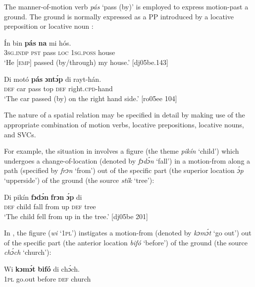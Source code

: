 The manner-of-motion verb \textit{pás} ‘pass (by)’ is employed to express motion-past a ground. The ground is normally expressed as a PP introduced by a locative preposition  or locative noun : 


\ea%
    \label{ex:key:986}
    \gll \'{I}n    bin  \textbf{pás}  \textbf{na} mi    hós.\\
\textsc{3sg.indp}  \textsc{pst}  pass  \textsc{loc}  \textsc{1sg.poss}  house\\
\glt ‘He [\textsc{emp}] passed (by/through) my house.’ [dj05be.143]
\z

\ea%
    \label{ex:key:987}
    \gll Di  motó  \textbf{pás}  \textbf{ɔntɔ́p}  di  rayt-hán.\\
\textsc{def}  car    pass  top    \textsc{def}  right.\textsc{cpd}{}-hand\\

\glt ‘The car passed (by) on the right hand side.’ [ro05ee 104]
\z

The nature of a spatial relation may be specified in detail by making use of the appropriate combination of motion verbs, locative prepositions, locative nouns, and SVCs.


For example, the situation in  involves a figure (the theme \textit{pikín} ‘child’) which undergoes a change-of-location (denoted by \textit{fɔdɔ́n} ‘fall’) in a motion-from along a path (specified by \textit{frɔn} ‘from’) out of the specific part (the superior location \textit{ɔ́p} ‘upperside’) of the ground (the source \textit{stík} ‘tree’):



\ea%
    \label{ex:key:988}
    \gll Di  pikín  \textbf{fɔdɔ́n}  \textbf{frɔn}    \textbf{ɔ́p}  di  \\
\textsc{def}  child  fall    from  up  \textsc{def}  tree\\

\glt ‘The child fell from up in the tree.’ [dj05be 201]
\z

In , the figure (\textit{wi} ‘\textsc{1pl}’) instigates a motion-from (denoted by \textit{kɔmɔ́t} ‘go out’) out of the specific part (the anterior location \textit{bifó} ‘before’) of the ground (the source \textit{chɔ́ch} ‘church’): 


\ea%
    \label{ex:key:989}
    \gll Wi  \textbf{kɔmɔ́t}  \textbf{bifó}    di  chɔ́ch.\\
\textsc{1pl}  go.out  before  \textsc{def}  church\\

